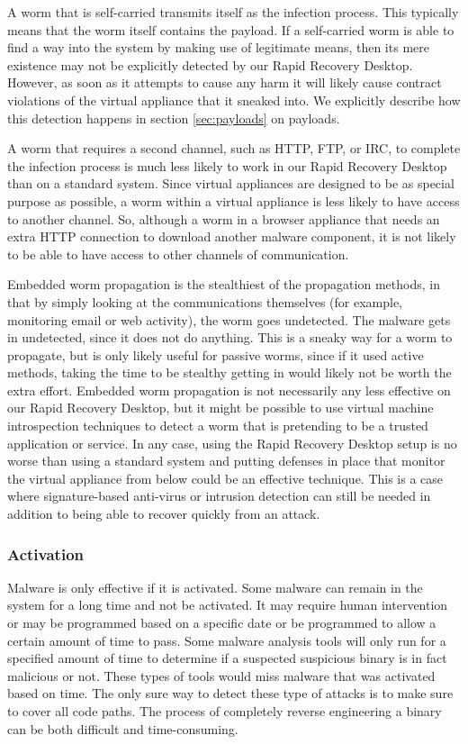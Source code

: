 A worm that is self-carried transmits itself as the infection process. This typically means that the worm itself contains the payload. If a self-carried worm is able to find a way into the system by making use of legitimate means, then its mere existence may not be explicitly detected by our Rapid Recovery Desktop. However, as soon as it attempts to cause any harm it will likely cause contract violations of the virtual appliance that it sneaked into. We explicitly describe how this detection happens in section \ref{sec:payloads} on payloads.

A worm that requires a second channel, such as HTTP, FTP, or IRC, to complete the infection process is much less likely to work in our Rapid Recovery Desktop than on a standard system. Since virtual appliances are designed to be as special purpose as possible, a worm within a virtual appliance is less likely to have access to another channel. So, although a worm in a browser appliance that needs an extra HTTP connection to download another malware component, it is not likely to be able to have access to other channels of communication.

Embedded worm propagation is the stealthiest of the propagation methods, in that by simply looking at the communications themselves (for example, monitoring email or web activity), the worm goes undetected. The malware gets in undetected, since it does not do anything. This is a sneaky way for a worm to propagate, but is only likely useful for passive worms, since if it used active methods, taking the time to be stealthy getting in would likely not be worth the extra effort. Embedded worm propagation is not necessarily any less effective on our Rapid Recovery Desktop, but it might be possible to use virtual machine introspection techniques to detect a worm that is pretending to be a trusted application or service. In any case, using the Rapid Recovery Desktop setup is no worse than using a standard system and putting defenses in place that monitor the virtual appliance from below could be an effective technique. This is a case where signature-based anti-virus or intrusion detection can still be needed in addition to being able to recover quickly from an attack.

\subsubsection{Activation}

Malware is only effective if it is activated. Some malware can remain in the system for a long time and not be activated. It may require human intervention or may be programmed based on a specific date or be programmed to allow a certain amount of time to pass. Some malware analysis tools will only run for a specified amount of time to determine if a suspected suspicious binary is in fact malicious or not. These types of tools would miss malware that was activated based on time. The only sure way to detect these type of attacks is to make sure to cover all code paths. The process of completely reverse engineering a binary can be both difficult and time-consuming. 

